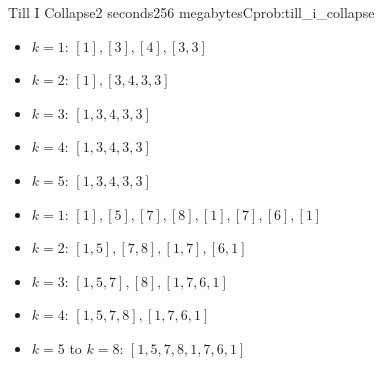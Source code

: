 \begin{programmingproblem}{Till I Collapse}{2 seconds}{256 megabytes}{C}{prob:till_i_collapse}

    \begin{itemize}
        \item $k=1$: $[1], [3], [4], [3, 3]$
        \item $k=2$: $[1], [3, 4, 3, 3]$
        \item $k=3$: $[1, 3, 4, 3, 3]$
        \item $k=4$: $[1, 3, 4, 3, 3]$
        \item $k=5$: $[1, 3, 4, 3, 3]$
    \end{itemize}


    \begin{itemize}
        \item $k=1$: $[1], [5], [7], [8], [1], [7], [6], [1]$
        \item $k=2$: $[1, 5], [7, 8], [1, 7], [6, 1]$
        \item $k=3$: $[1, 5, 7], [8], [1, 7, 6, 1]$
        \item $k=4$: $[1, 5, 7, 8], [1, 7, 6, 1]$
        \item $k=5$ to $k=8$: $[1, 5, 7, 8, 1, 7, 6, 1]$
    \end{itemize}
\end{programmingproblem}
